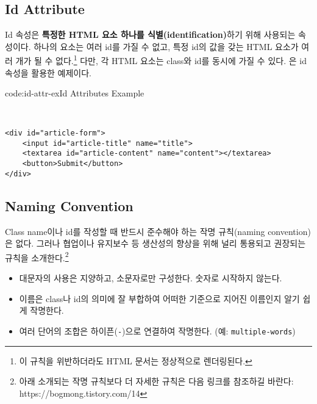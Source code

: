 \subsection*{Id Attribute}
Id 속성은 \textbf{특정한 HTML 요소 하나를 식별(identification)}하기 위해 사용되는 속성이다. 하나의 요소는 여러 id를 가질 수 없고, 특정 id의 값을 갖는 HTML 요소가 여러 개가 될 수 없다.\footnote{이 규칙을 위반하더라도 HTML 문서는 정상적으로 렌더링된다.} 다만, 각 HTML 요소는 class와 id를 동시에 가질 수 있다. 은 id 속성을 활용한 예제이다.

\begin{codeenv}{code:id-attr-ex}{Id Attributes Example}\begin{verbatim}


<div id="article-form">
    <input id="article-title" name="title">
    <textarea id="article-content" name="content"></textarea>
    <button>Submit</button>
</div>
\end{verbatim}
\end{codeenv}

\subsection*{Naming Convention}
Class name이나 id를 작성할 때 반드시 준수해야 하는 작명 규칙(naming convention)은 없다. 그러나 협업이나 유지보수 등 생산성의 향상을 위해 널리 통용되고 권장되는 규칙을 소개한다.\footnote{아래 소개되는 작명 규칙보다 더 자세한 규칙은 다음 링크를 참조하길 바란다: https://bogmong.tistory.com/14}

\begin{itemize}
    \item 대문자의 사용은 지양하고, 소문자로만 구성한다. 숫자로 시작하지 않는다.
    \item 이름은 class나 id의 의미에 잘 부합하여 어떠한 기준으로 지어진 이름인지 알기 쉽게 작명한다.
    \item 여러 단어의 조합은 하이픈(\verb|-|)으로 연결하여 작명한다. (예: \verb|multiple-words|)
\end{itemize}

